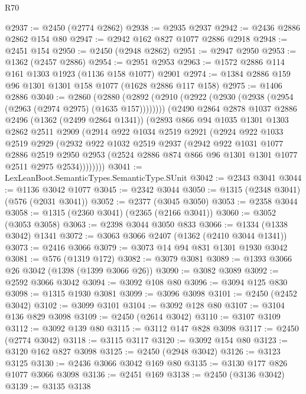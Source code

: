 \begin{lexlean}{R70}
\begin{coremodule}
@2937 := @2450 (@2774 @2862)
@2938 := @2935 @2937
@2942 := @2436 @2886 @2862 @154 @80
@2947 := @2942 @162 @827 @1077 @2886 @2918
@2948 := @2451 @154
@2950 := @2450 (@2948 @2862)
@2951 := @2947 @2950
@2953 := @1362 (@2457 @2886)
@2954 := @2951 @2953
@2963 := @1572 @2886 @114 @161 @1303 @1923 (@1136 @158 @1077) @2901
@2974 := @1384 @2886 @159 @96 @1301 @1301 @158 @1077 (@1628 @2886 @117 @158)
@2975 := @1406 @2886
@3040 := @2860
    (@2880
      (@2892 (@2910 (@2922 (@2930 (@2938 (@2954 (@2963 (@2974 @2975) (@1635 @157))))))))
      (@2490
        @2864
        @2878
        @1037
        @2886
        @2496
        (@1362 (@2499 @2864 @1341))
        (@2893
          @866
          @94
          @1035
          @1301
          @1303
          @2862
          @2511
          @2909
          (@2914
            @922
            @1034
            @2519
            @2921
            (@2924
              @922
              @1033
              @2519
              @2929
              (@2932
                @922
                @1032
                @2519
                @2937
                (@2942
                  @922
                  @1031
                  @1077
                  @2886
                  @2519
                  @2950
                  @2953
                  (@2524 @2886 @874 @866 @96 @1301 @1301 @1077 @2511 @2975 @2534))))))))
@3041 := LexLeanBoot.SemanticTypes.SemanticType.SUnit
@3042 := @2343 @3041
@3044 := @1136 @3042 @1077
@3045 := @2342 @3044
@3050 := @1315 (@2348 @3041) (@576 (@2031 @3041))
@3052 := @2377 (@3045 @3050)
@3053 := @2358 @3044
@3058 := @1315 (@2360 @3041) (@2365 (@2166 @3041))
@3060 := @3052 (@3053 @3058)
@3063 := @2398 @3044 @3050 @833
@3066 := @1334 (@1338 @3042) @1341
@3072 := @3063 @3066 @2407 (@1362 (@2410 @3044 @1341))
@3073 := @2416 @3066
@3079 := @3073 @14 @94 @831 @1301 @1930 @3042
@3081 := @576 (@1319 @172)
@3082 := @3079 @3081
@3089 := @1393 @3066 @26 @3042 (@1398 (@1399 @3066 @26))
@3090 := @3082 @3089
@3092 := @2592 @3066 @3042
@3094 := @3092 @108 @80
@3096 := @3094 @125 @830
@3098 := @1315 @1930 @3081
@3099 := @3096 @3098
@3101 := @2450 (@2452 @3042)
@3102 := @3099 @3101
@3104 := @3092 @128 @80
@3107 := @3104 @136 @829 @3098
@3109 := @2450 (@2614 @3042)
@3110 := @3107 @3109
@3112 := @3092 @139 @80
@3115 := @3112 @147 @828 @3098
@3117 := @2450 (@2774 @3042)
@3118 := @3115 @3117
@3120 := @3092 @154 @80
@3123 := @3120 @162 @827 @3098
@3125 := @2450 (@2948 @3042)
@3126 := @3123 @3125
@3130 := @2436 @3066 @3042 @169 @80
@3135 := @3130 @177 @826 @1077 @3066 @3098
@3136 := @2451 @169
@3138 := @2450 (@3136 @3042)
@3139 := @3135 @3138

\end{coremodule}
\end{lexlean}
